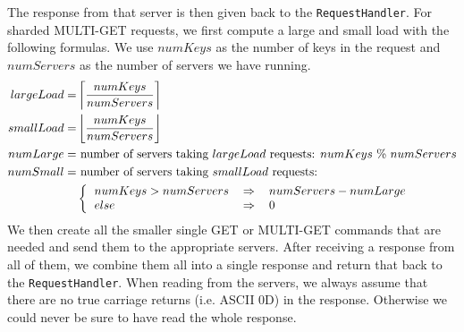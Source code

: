 \documentclass[11pt,a4paper]{article}
\newcommand{\co}[1]{\texttt{#1}}
\begin{document}
The response from that server is then given back to the \co{RequestHandler}. For sharded MULTI-GET	requests, we first compute a large and small load with the following formulas. We use $numKeys$ as the number of keys in the request and $numServers$ as the number of servers we have running.
	\begin{equation}
	\begin{split}
		largeLoad = & \left\lceil\frac{numKeys}{numServers}\right\rceil\\
		smallLoad = & \left\lfloor\frac{numKeys}{numServers}\right\rfloor\\
		numLarge = & \text{ number of servers taking } largeLoad \text{ requests: } numKeys\ \%\ numServers\\
		numSmall = & \text{ number of servers taking } smallLoad \text{ requests: } \\
		& \left\{\begin{tabular}{l l l}
			$numKeys > numServers$ & $\Rightarrow$ & $numServers - numLarge$\\
			$else$ & $\Rightarrow$ & 0
		\end{tabular}\right.
	\end{split}
	\end{equation}
We then create all the smaller single GET or MULTI-GET commands that are needed and send them to the appropriate servers. After receiving a response from all of them, we combine them all into a single response and return that back to the \co{RequestHandler}. When reading from the servers, we always assume that there are no true carriage returns (i.e. ASCII 0D) in the response. Otherwise we could never be sure to have read the whole response.
\end{document}
